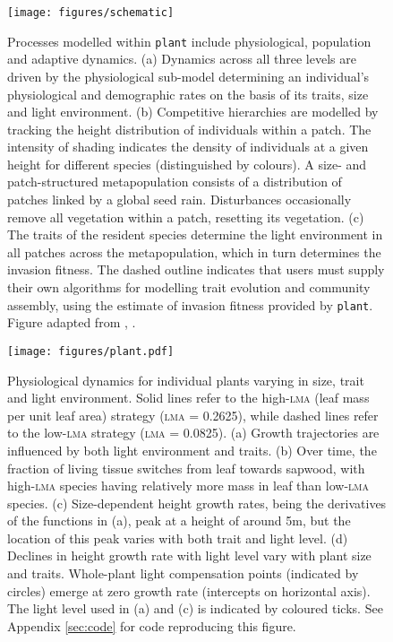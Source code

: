 \documentclass[a4paper,11pt]{article}
\newcommand{\plant}{\texttt{plant}}
\begin{document}
\begin{figure}[h!]
\centering
\texttt{[image: figures/schematic]}

\caption{Processes modelled within {\plant} include physiological, population and
adaptive dynamics.
(a) Dynamics across all three levels are driven by the
physiological sub-model determining an individual's physiological and
demographic rates on the basis of its traits, size and light environment.
(b) Competitive hierarchies are modelled by tracking the height distribution of
individuals within a patch. The intensity
of shading indicates the density of individuals at a given height for
different species (distinguished by colours). A size- and patch-structured
metapopulation consists of a distribution of patches linked by a global seed rain.
Disturbances occasionally remove all vegetation within a patch, resetting its vegetation. (c) The traits of the resident species determine the light environment
in all patches across the metapopulation, which in turn determines the invasion fitness.
The dashed outline indicates that users must supply their own algorithms for
modelling trait evolution and community assembly, using the estimate of
invasion fitness provided by {\plant}. Figure adapted from
\citet{Falster-2011}, \citet{Falster-2015}.
}

\label{fig:schematic}
\end{figure}

\newpage

\begin{figure}[h!]
\centering
\texttt{[image: figures/plant.pdf]}
\caption{Physiological dynamics for individual plants varying in size,
 trait and light environment. Solid lines refer to the high-\textsc{lma} (leaf mass per unit leaf area) strategy (\textsc{lma} =
 0.2625), while dashed lines refer to the low-\textsc{lma} strategy
 (\textsc{lma} = 0.0825). (a) Growth trajectories are influenced by
 both light environment and traits. (b) Over time, the fraction of
 living tissue switches from leaf towards sapwood, with high-\textsc{lma} species having relatively more mass in leaf than low-\textsc{lma} species. (c)
 Size-dependent height growth rates, being the derivatives of the functions in (a), peak at a height of around
 5m, but the location of this peak varies with both trait and light
 level. (d) Declines in height growth rate with light level vary with plant size
 and traits. Whole-plant light compensation points (indicated by
 circles) emerge at zero growth rate (intercepts on horizontal axis).
 The light level used in (a) and (c) is indicated by
 coloured ticks. See Appendix \ref{sec:code} for code
 reproducing this figure.}
\label{fig:plant}
\end{figure}
\end{document}
